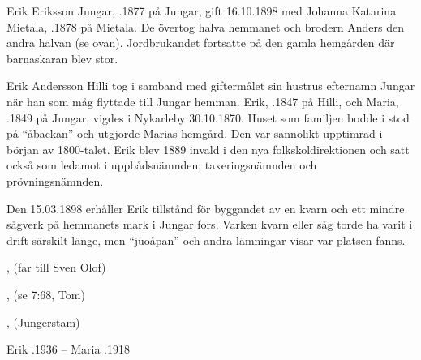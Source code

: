 Erik Eriksson Jungar, .1877 på Jungar, gift 16.10.1898 med Johanna Katarina Mietala, .1878 på Mietala. De övertog halva hemmanet och brodern Anders den andra halvan (se ovan). Jordbrukandet fortsatte på den gamla hemgården där barnaskaran blev stor.
\begin{jhchildren}
  \item {}
  \item {}
  \item {}
  \item {}
  \item {}
  \item {}
  \item {}
  \item {}
  \item {}
  \item {}
\end{jhchildren}


Erik Andersson Hilli tog i samband med giftermålet sin hustrus efternamn Jungar när han som måg flyttade till Jungar hemman. Erik, .1847 på Hilli, och Maria, .1849 på Jungar, vigdes i Nykarleby 30.10.1870. Huset som familjen bodde i stod på ``åbackan'' och utgjorde Marias hemgård. Den var sannolikt upptimrad i början av 1800-talet. Erik blev 1889 invald i den nya folkskoldirektionen och satt också som ledamot i uppbådsnämnden, taxeringsnämnden och prövningsnämnden.

Den 15.03.1898 erhåller Erik tillstånd för byggandet av en kvarn och ett mindre sågverk på hemmanets mark i Jungar fors. Varken kvarn eller såg torde ha varit i drift särskilt länge, men ``juoåpan'' och andra lämningar visar var platsen fanns.
\begin{jhchildren}
  \item {}
  \item {}
  \item {}, (far till Sven Olof)
  \item {}, (se 7:68, Tom)
  \item {}, (Jungerstam)
  \item {}
\end{jhchildren}
Erik .1936  --  Maria .1918

